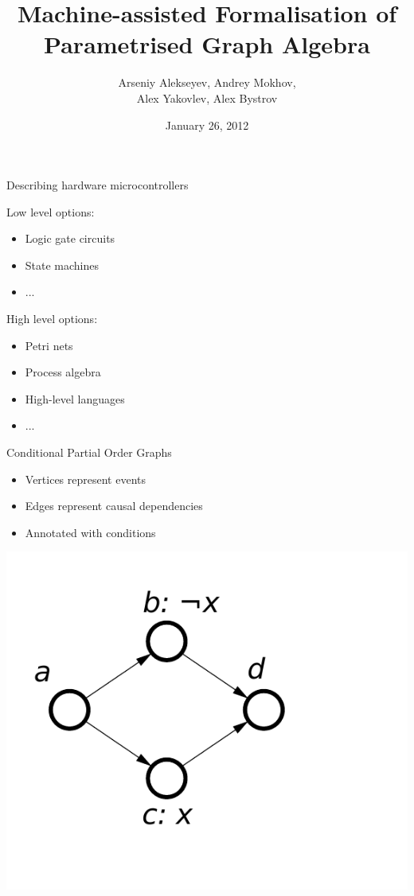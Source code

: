 \documentclass[12pt]{beamer}
\title{Machine-assisted Formalisation of Parametrised Graph Algebra}
\author[A. Alekseyev, A. Mokhov, A. Yakovlev, A. Bystrov]{Arseniy Alekseyev, Andrey Mokhov, \\ Alex Yakovlev, Alex Bystrov}
\institute[EECE MSD]{
  Microelectronic System Design Group \\
  Department of EECE \\
  Newcastle University
}
\date{January 26, 2012}
\begin{document}
\begin{frame}
  \titlepage
\end{frame}

\begin{frame}{Describing hardware microcontrollers}

Low level options:

\begin{itemize}
  \item Logic gate circuits
  \item State machines
  \item ...
\end{itemize}

High level options:

\begin{itemize}
  \item Petri nets
  \item Process algebra
  \item High-level languages
  \item ...
\end{itemize}

\end{frame}

\begin{frame}{Conditional Partial Order Graphs}
\begin{itemize}
\item Vertices represent events
\item Edges represent causal dependencies
\item Annotated with conditions
\end{itemize}

\begin{centering}
\hfill{}\includegraphics[scale=0.5]{fig/cpog_example}\hfill{}
\end{centering}

\end{frame}
\end{document}

